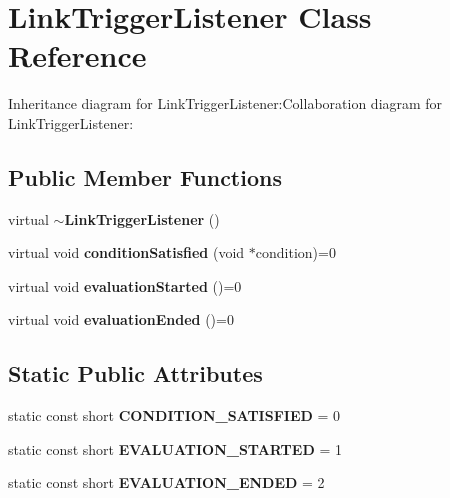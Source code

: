 \section{LinkTriggerListener Class Reference}
\label{classbr_1_1pucrio_1_1telemidia_1_1ginga_1_1ncl_1_1model_1_1link_1_1LinkTriggerListener}
Inheritance diagram for LinkTriggerListener:Collaboration diagram for LinkTriggerListener:\subsection*{Public Member Functions}
\begin{CompactItemize}
\item 
virtual {\bf $\sim$LinkTriggerListener} ()\label{classbr_1_1pucrio_1_1telemidia_1_1ginga_1_1ncl_1_1model_1_1link_1_1LinkTriggerListener_6d15ec61b99455218b547b10af0fe441}

\item 
virtual void \textbf{conditionSatisfied} (void $\ast$condition)=0\label{classbr_1_1pucrio_1_1telemidia_1_1ginga_1_1ncl_1_1model_1_1link_1_1LinkTriggerListener_c677dd14ecffcf010d63d8a1295bb053}

\item 
virtual void \textbf{evaluationStarted} ()=0\label{classbr_1_1pucrio_1_1telemidia_1_1ginga_1_1ncl_1_1model_1_1link_1_1LinkTriggerListener_970e1f9c4e756a2efdbd23c2daf3cafe}

\item 
virtual void \textbf{evaluationEnded} ()=0\label{classbr_1_1pucrio_1_1telemidia_1_1ginga_1_1ncl_1_1model_1_1link_1_1LinkTriggerListener_6791c0bb8701e87c58459fcc13be6bd9}

\end{CompactItemize}
\subsection*{Static Public Attributes}
\begin{CompactItemize}
\item 
static const short {\bf CONDITION\_\-SATISFIED} = 0\label{classbr_1_1pucrio_1_1telemidia_1_1ginga_1_1ncl_1_1model_1_1link_1_1LinkTriggerListener_909b1a1437d9c179b9c5271fa5fb0091}

\item 
static const short {\bf EVALUATION\_\-STARTED} = 1\label{classbr_1_1pucrio_1_1telemidia_1_1ginga_1_1ncl_1_1model_1_1link_1_1LinkTriggerListener_7dc5bb508f2e71e40cb3a52ed63bea71}

\item 
static const short {\bf EVALUATION\_\-ENDED} = 2\label{classbr_1_1pucrio_1_1telemidia_1_1ginga_1_1ncl_1_1model_1_1link_1_1LinkTriggerListener_6fc01577861319052d568fc3b5b6016b}

\end{CompactItemize}


